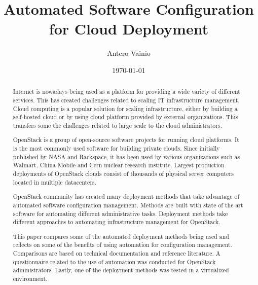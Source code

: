 \documentclass[english,twoside,censored,cs,nodes-line]{HYthesisML}
\title{Automated Software Configuration for Cloud Deployment}
\author{Antero Vainio}
\date{\today}
\begin{document}
\maketitle



\begin{abstract}

Internet is nowadays being used as a platform for providing a wide variety of
different services. This has created challenges related to scaling IT
infrastructure management. Cloud computing is a popular solution for scaling
infrastructure, either by building a self-hosted cloud or by using cloud
platform provided by external organizations. This transfers some the challenges
related to large scale to the cloud administrators.

OpenStack is a group of open-source software projects for running cloud
platforms. It is the most commonly used software for building private clouds.
Since initially published by NASA and Rackspace, it has been used by various
organizations such as Walmart, China Mobile and Cern nuclear research
institute. Largest production deployments of OpenStack clouds consist of
thousands of physical server computers located in multiple datacenters.

OpenStack community has created many deployment methods that take advantage of
automated software configuration management. Methods are built with state of
the art software for automating different administrative tasks. Deployment
methods take different approaches to automating infrastructure management for
OpenStack.

This paper compares some of the automated deployment methods being used and
reflects on some of the benefits of using automation for configuration
management. Comparisons are based on technical documentation and reference
literature. A questionnaire related to the use of automation was conducted for
OpenStack administrators. Lastly, one of the deployment methods was tested in a
virtualized environment.

\end{abstract}
\end{document}
